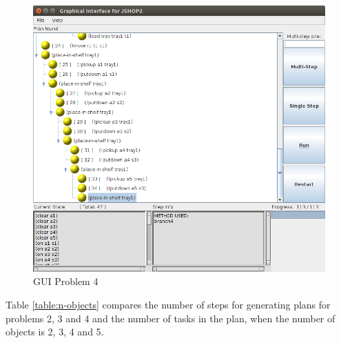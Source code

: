 \documentclass[paper=a4, fontsize=11pt]{scrartcl}
\begin{document}
	\begin{figure}[h!]
	\centering
	\includegraphics[width=1\linewidth]{images/problem4_gui}
	\caption{GUI Problem 4}
	\label{fig:problem4_gui}
	\end{figure}
	
	Table \ref{table:n-objects} compares the number of steps for generating plans for problems 2, 3 and 4 and the number of tasks in the plan, when the number of objects is 2, 3, 4 and 5.
	
\end{document}
